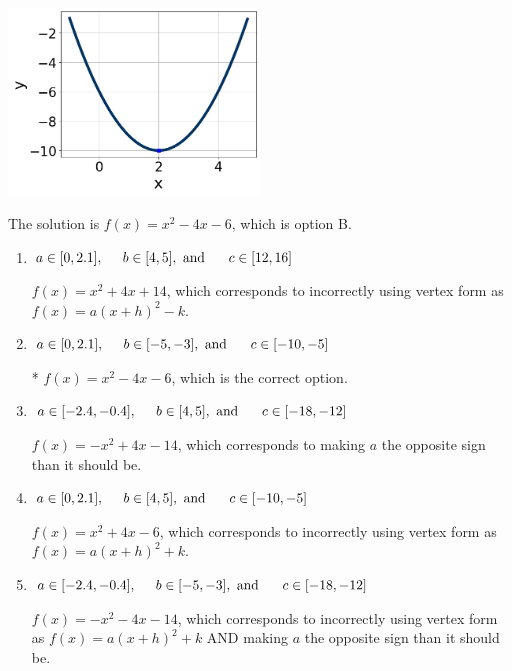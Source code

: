 \documentclass{extbook}[14pt]
\begin{document}
\begin{enumerate}
{\begin{center}
    \includegraphics[width=0.5\textwidth]{../Figures/quadraticGraphToEquationCopyB.png}
\end{center}




The solution is \( f(x) = x^{2} -4 x -6 \), which is option B.\begin{enumerate}[label=\Alph*.]
\item \( a \in [0, 2.1], \hspace*{5mm} b \in [4, 5], \text{ and } \hspace*{5mm} c \in [12, 16] \)

$f(x)=x^{2} +4 x + 14$, which corresponds to incorrectly using vertex form as $f(x) = a(x+h)^2 - k$.
\item \( a \in [0, 2.1], \hspace*{5mm} b \in [-5, -3], \text{ and } \hspace*{5mm} c \in [-10, -5] \)

* $f(x)=x^{2} -4 x -6$, which is the correct option.
\item \( a \in [-2.4, -0.4], \hspace*{5mm} b \in [4, 5], \text{ and } \hspace*{5mm} c \in [-18, -12] \)

$f(x)=-x^{2} +4 x -14$, which corresponds to making $a$ the opposite sign than it should be.
\item \( a \in [0, 2.1], \hspace*{5mm} b \in [4, 5], \text{ and } \hspace*{5mm} c \in [-10, -5] \)

$f(x)=x^{2} +4 x -6$, which corresponds to incorrectly using vertex form as $f(x) = a(x+h)^2+k$.
\item \( a \in [-2.4, -0.4], \hspace*{5mm} b \in [-5, -3], \text{ and } \hspace*{5mm} c \in [-18, -12] \)

$f(x)=-x^{2} -4 x -14$, which corresponds to incorrectly using vertex form as $f(x) = a(x+h)^2+k$ AND making $a$ the opposite sign than it should be.
\end{enumerate}

}
\end{enumerate}
\end{document}
